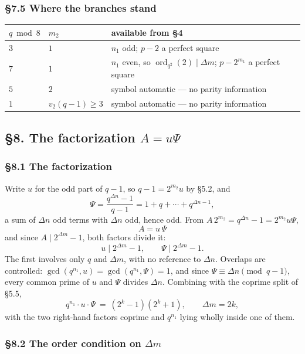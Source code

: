 \documentclass[11pt]{article}
\begin{document}
\subsubsection*{\S7.5 Where the branches stand}

\begin{center}
\begin{tabular}{lll}
\hline
$q \bmod 8$ & $m_2$ & available from \S4 \\
\hline
$3$ & $1$ & $n_1$ odd; $p - 2$ a perfect square \\
$7$ & $1$ & $n_1$ even, so $\operatorname{ord}_{q^2}(2) \mid \Delta m$; $p - 2^{m_1}$ a perfect square \\
$5$ & $2$ & symbol automatic --- no parity information \\
$1$ & $v_2(q-1) \geq 3$ & symbol automatic --- no parity information \\
\hline
\end{tabular}
\end{center}

\subsection*{\S8. The factorization $A = u\Psi$}

\subsubsection*{\S8.1 The factorization}

Write $u$ for the odd part of $q-1$, so $q - 1 = 2^{m_2}u$ by \S5.2, and
\[
\Psi = \frac{q^{\Delta n}-1}{q-1} = 1 + q + \cdots + q^{\Delta n-1},
\]
a sum of $\Delta n$ odd terms with $\Delta n$ odd, hence odd. From $A\,2^{m_2} = q^{\Delta n}-1 = 2^{m_2}u\Psi$,
\[
\boxed{\,A = u\,\Psi\,}
\]
and since $A \mid 2^{\Delta m}-1$, both factors divide it:
\[
u \mid 2^{\Delta m}-1, \qquad \Psi \mid 2^{\Delta m}-1 .
\]
The first involves only $q$ and $\Delta m$, with no reference to $\Delta n$. Overlaps are controlled: $\gcd\!\left(q^{n_1},u\right) = \gcd\!\left(q^{n_1},\Psi\right) = 1$, and since $\Psi \equiv \Delta n \pmod{q-1}$, every common prime of $u$ and $\Psi$ divides $\Delta n$. Combining with the coprime split of \S5.5,
\[
q^{n_1}\cdot u \cdot \Psi \ = \ \left(2^{k}-1\right)\left(2^{k}+1\right), \qquad \Delta m = 2k,
\]
with the two right-hand factors coprime and $q^{n_1}$ lying wholly inside one of them.

\subsubsection*{\S8.2 The order condition on $\Delta m$}
\end{document}
